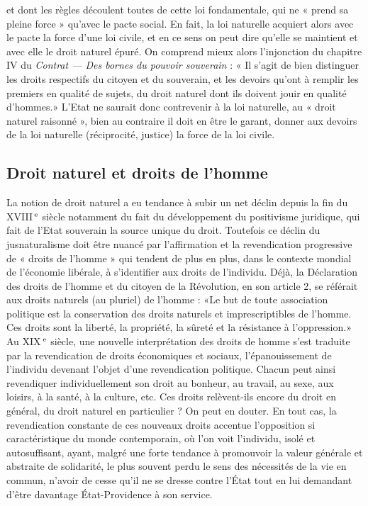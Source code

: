 et dont les règles découlent toutes de
cette loi fondamentale, qui ne « prend sa
pleine force » qu'avec le pacte social. En
fait, la loi naturelle acquiert alors avec le
pacte la force d’une loi civile, et en ce sens
on peut dire qu’elle se maintient et avec
elle le droit naturel épuré. On comprend
mieux alors l’injonction du chapitre IV du
{\it Contrat — Des bornes du pouvoir souverain} : « Il s’agit de bien distinguer les
droits respectifs du citoyen et du souverain, et les devoirs qu'ont à remplir les
premiers en qualité de sujets, du droit
naturel dont ils doivent jouir en qualité
d'hommes.» L'Etat ne saurait donc
contrevenir à la loi naturelle, au « droit
naturel raisonné », bien au contraire il
doit en être le garant, donner aux devoirs
de la loi naturelle (réciprocité, justice) la
force de la loi civile.

\subsection{Droit naturel et droits de l’homme}

La notion de droit naturel a eu tendance à subir un net déclin depuis la fin
du {\footnotesize XVIII}$^\text{\,e}$ siècle notamment du fait du développement
%
 du positivisme juridique, qui fait
de l'Etat souverain la source unique du
droit. Toutefois ce déclin du jusnaturalisme doit être nuancé par l’affirmation et
la revendication progressive de « droits de
l’homme » qui tendent de plus en plus,
dans le contexte mondial de l’économie
libérale, à s'identifier aux droits de l’individu. Déjà, la Déclaration des droits de
l’homme et du citoyen de la Révolution,
en son article 2, se référait aux droits
naturels (au pluriel) de l’homme : «Le
but de toute association politique est la
conservation des droits naturels et imprescriptibles de l’homme. Ces droits sont la
liberté, la propriété, la sûreté et la résistance à l’oppression.» Au {\footnotesize XIX}$^\text{\,e}$ siècle, une
nouvelle interprétation des droits de
homme s’est traduite par la revendication de droits économiques et sociaux,
l'épanouissement de l’individu devenant
l’objet d’une revendication politique.
Chacun peut ainsi revendiquer individuellement son droit au bonheur, au travail,
au sexe, aux loisirs, à la santé, à la culture,
etc. Ces droits relèvent-ils encore du droit
en général, du droit naturel en particulier ? On peut en douter. En tout cas, la
revendication constante de ces nouveaux
droits accentue l’opposition si caractéristique du monde contemporain, où l’on
voit l'individu, isolé et autosuffisant,
ayant, malgré une forte tendance à promouvoir la valeur générale et abstraite de
solidarité, le plus souvent perdu le sens
des nécessités de la vie en commun,
n'avoir de cesse qu'il ne se dresse contre
l’État tout en lui demandant d’être davantage État-Providence à son service.
%






